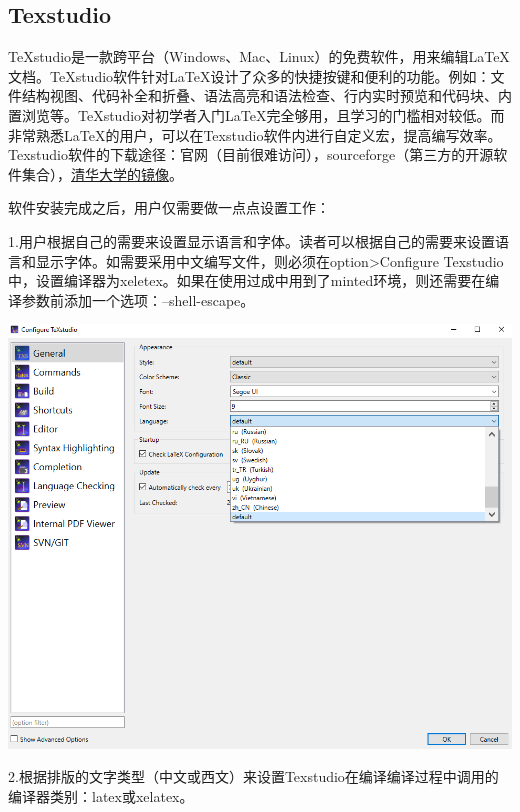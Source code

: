 \documentclass[12pt]{book}
\begin{document}
\subsection{Texstudio}
TeXstudio是一款跨平台（Windows、Mac、Linux）的免费软件，用来编辑\LaTeX{}文档。TeXstudio软件针对\LaTeX{}设计了众多的快捷按键和便利的功能。例如：文件结构视图、代码补全和折叠、语法高亮和语法检查、行内实时预览和代码块、内置浏览等。TeXstudio对初学者入门\LaTeX{}完全够用，且学习的门槛相对较低。而非常熟悉\LaTeX{}的用户，可以在Texstudio软件内进行自定义宏，提高编写效率。Texstudio软件的下载途径：官网（目前很难访问），sourceforge（第三方的开源软件集合），\href{https://mirrors.tuna.tsinghua.edu.cn/github-release/texstudio-org/texstudio/}{清华大学的镜像}。

软件安装完成之后，用户仅需要做一点点设置工作：

1.用户根据自己的需要来设置显示语言和字体。读者可以根据自己的需要来设置语言和显示字体。如需要采用中文编写文件，则必须在option>Configure Texstudio 中，设置编译器为xeletex。如果在使用过成中用到了minted环境，则还需要在编译参数前添加一个选项：--shell-escape。

\begin{center}
     \includegraphics[scale=0.8]{./texstudio-lang.png}
\end{center}
2.根据排版的文字类型（中文或西文）来设置Texstudio在编译编译过程中调用的编译器类别：latex或xelatex。
\end{document}
